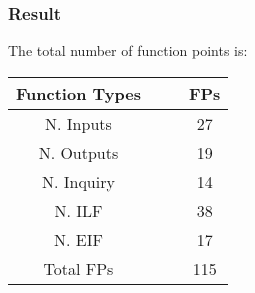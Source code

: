 		\subsubsection{Result}
			The total number of function points is:
			\vspace{0.5cm}
			\begin{center}
				\begin{tabular}{c c c c}
					\hline 	\textbf{Function Types} &	&	& \textbf{FPs} \\[0.1cm]
					\hline	N. Inputs & & & 27 \\[0.05cm]
						N. Outputs & & & 19  \\[0.05cm]
						N. Inquiry & & & 14  \\[0.05cm]
						N. ILF & & & 38  \\[0.05cm]
						N. EIF & & & 17  \\[0.05cm]
					\hline Total FPs & & & 115\\[0.05cm]
					\hline
				\end{tabular}
			\end{center}
			\vspace{0.5cm}
	\newpage
